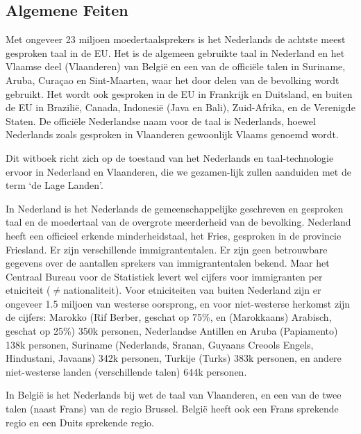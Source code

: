 \documentclass[]{../../metanetpaper}
\begin{document}
\begin{multicols}{2}

\subsection{Algemene Feiten}

Met ongeveer 23 miljoen moedertaalsprekers is het Nederlands de achtste meest gesproken taal in de EU. Het is de algemeen gebruikte taal in Nederland en het Vlaamse deel (Vlaanderen) van Belgi{\"e} en een van de offici{\"e}le talen in Suriname, Aruba, Cura{\c{c}}ao en Sint-Maarten, waar het door delen van de bevolking wordt gebruikt. Het wordt ook gesproken in de EU in Frankrijk en Duitsland, en buiten de EU in Brazili{\"e}, Canada, Indonesi{\"e} (Java en Bali), Zuid-Afrika, en de Verenigde Staten. De offici{\"e}le Nederlandse naam voor de taal is Nederlands, hoewel Nederlands zoals gesproken in Vlaanderen gewoonlijk Vlaams genoemd wordt.

    Dit witboek richt zich op de toestand van het Nederlands en taal-technologie ervoor in Nederland en Vlaanderen, die we gezamen-lijk zullen aanduiden met de term `de Lage Landen'.

    In Nederland is het Nederlands de gemeenschappelijke geschreven en gesproken taal en de moedertaal van de overgrote meerderheid van de bevolking. Nederland heeft een officieel erkende minderheidstaal, het Fries, gesproken in de provincie Friesland. Er zijn verschillende immigrantentalen. Er zijn geen betrouwbare gegevens over de aantallen sprekers van immigrantentalen bekend. Maar het Centraal Bureau voor de Statistiek \cite{CBS} levert wel cijfers voor immigranten per etniciteit ($\neq$nationaliteit). Voor etniciteiten van buiten Nederland zijn er ongeveer 1.5 miljoen van westerse oorsprong, en voor niet-westerse herkomst zijn de cijfers: Marokko (Rif Berber, geschat op 75\%, en (Marokkaans) Arabisch, geschat op 25\%) 350k personen, Nederlandse Antillen en Aruba (Papiamento) 138k personen, Suriname (Nederlands, Sranan, Guyaans Creools Engels, Hindustani, Javaans) 342k personen, Turkije (Turks) 383k personen, en andere niet-westerse landen (verschillende talen) 644k personen.


    In Belgi{\"e} is het Nederlands bij wet de taal van Vlaanderen, en een van de twee talen (naast Frans) van de regio Brussel. Belgi{\"e} heeft ook een Frans sprekende regio en een Duits sprekende regio.


\end{multicols}
\end{document}
